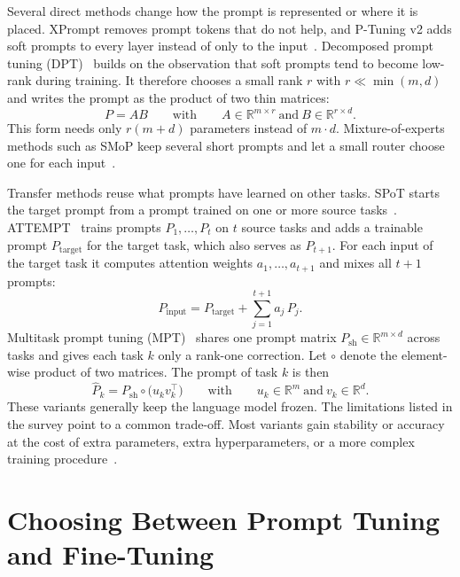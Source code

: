 \documentclass[12pt]{article}
\newcommand{\R}{\mathbb{R}}
\begin{document}
Several direct methods change how the prompt is represented or where it is placed. XPrompt
removes prompt tokens that do not help, and P-Tuning v2 adds soft prompts to every layer
instead of only to the input~\cite{li2025survey}. Decomposed prompt tuning
(DPT)~\cite{xiao2023dpt} builds on the observation that soft prompts tend to become low-rank
during training. It therefore chooses a small rank $r$ with $r\ll\min(m,d)$ and writes the
prompt as the product of two thin matrices:
\begin{equation}
  P=AB
  \qquad\text{with}\qquad
  A\in\R^{m\times r}\ \text{and}\ B\in\R^{r\times d}.
  \label{eq:dpt}
\end{equation}
This form needs only $r(m+d)$ parameters instead of $m\cdot d$. Mixture-of-experts methods such as
SMoP keep several short prompts and let a small router choose one for each
input~\cite{li2025survey}.

Transfer methods reuse what prompts have learned on other tasks. SPoT starts the target
prompt from a prompt trained on one or more source tasks~\cite{li2025survey}.
ATTEMPT~\cite{asai2022attempt} trains prompts $P_1,\dots,P_t$ on $t$ source tasks and adds a
trainable prompt $P_{\text{target}}$ for the target task, which also serves as $P_{t+1}$. For
each input of the target task it computes attention weights $a_1,\dots,a_{t+1}$ and mixes all
$t+1$ prompts:
\begin{equation}
  P_{\text{input}}=P_{\text{target}}+\sum_{j=1}^{t+1}a_j\,P_j.
  \label{eq:attempt}
\end{equation}
Multitask prompt tuning (MPT)~\cite{wang2023mpt} shares one prompt matrix
$P_{\text{sh}}\in\R^{m\times d}$ across tasks and gives each task $k$ only a rank-one
correction. Let $\circ$ denote the element-wise product of two matrices. The prompt of task
$k$ is then
\begin{equation}
  \hat{P}_k=P_{\text{sh}}\circ\bigl(u_k v_k^{\top}\bigr)
  \qquad\text{with}\qquad
  u_k\in\R^{m}\ \text{and}\ v_k\in\R^{d}.
  \label{eq:mpt}
\end{equation}
These variants generally keep the language model frozen. The limitations listed in the survey point to a common trade-off. Most variants
gain stability or accuracy at the cost of extra parameters, extra hyperparameters, or a more
complex training procedure~\cite{li2025survey}.

\section{Choosing Between Prompt Tuning and Fine-Tuning}\label{sec:choosing}
\end{document}
